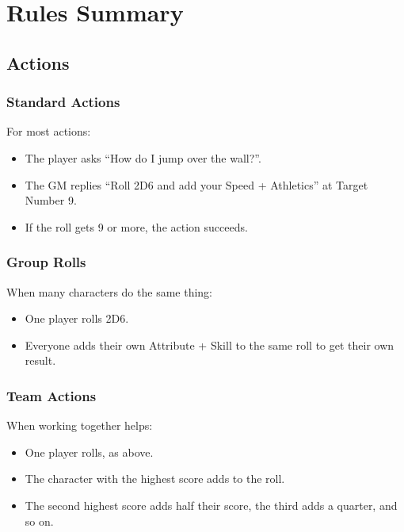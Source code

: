\section*{Rules Summary}

\begin{multicols}{2}

\subsection{Actions}

\subsubsection{Standard Actions}

For most actions:

\begin{itemize}

\item{The player asks ``How do I jump over the wall?''.}
\item{The GM replies ``Roll 2D6 and add your Speed + Athletics'' at Target Number 9.}
\item{If the roll gets 9 or more, the action succeeds.}

\end{itemize}

\subsubsection{Group Rolls}

When many characters do the same thing:

\begin{itemize}

\item{One player rolls 2D6.}
\item{Everyone adds their own Attribute + Skill to the same roll to get their own result.}

\end{itemize}

\subsubsection{Team Actions}

When working together helps:

\begin{itemize}

\item{One player rolls, as above.}
\item{The character with the highest score adds to the roll.}
\item{The second highest score adds half their score, the third adds a quarter, and so on.}


\end{itemize}
\end{multicols}

